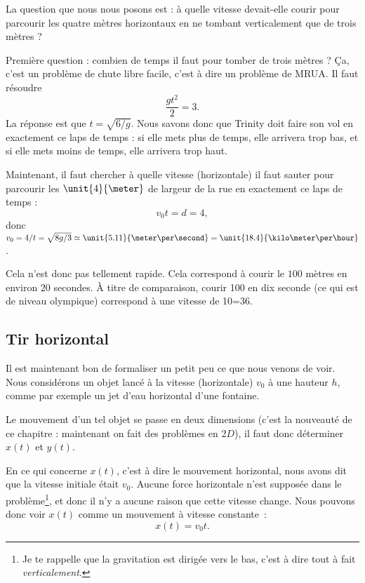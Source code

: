\documentclass[a4paper,12pt]{book}
\theoremstyle{mes_exemples}	\newtheorem{exemple}[numtho]{Exemple}
\theoremstyle{mes_tho}
\begin{document}
La question que nous nous posons est : à quelle vitesse devait-elle courir pour parcourir les quatre mètres horizontaux en ne tombant verticalement que de trois mètres ?

Première question : combien de temps il faut pour tomber de trois mètres ? Ça, c'est un problème de chute libre facile, c'est à dire un problème de MRUA. Il faut résoudre
\begin{equation}
	\frac{ gt^2 }{ 2 }=3.
\end{equation}
La réponse est que $t=\sqrt{6/g}$. Nous savons donc que Trinity doit faire son vol en exactement ce laps de temps : si elle mets plus de temps, elle arrivera trop bas, et si elle mets moins de temps, elle arrivera trop haut.

Maintenant, il faut chercher à quelle vitesse (horizontale) il faut sauter pour parcourir les $\unit{4}{\meter}$ de largeur de la rue en exactement ce laps de temps :
\begin{equation}
	v_0t=d=4,
\end{equation}
donc $v_0=4/t=\sqrt{8g/3}\simeq \unit{5.11}{\meter\per\second}=\unit{18.4}{\kilo\meter\per\hour}$.

Cela n'est donc pas tellement rapide. Cela correspond à courir le $100$ mètres en environ $20$ secondes. À titre de comparaison, courir \unit{100}{\meter} en dix seconde (ce qui est de niveau olympique) correspond à une vitesse de \unit{10}{\meter\per\second}=\unit{36}{\kilo\meter\per\hour}.

\subsection{Tir horizontal}

Il est maintenant bon de formaliser un petit peu ce que nous venons de voir. Nous considérons un objet lancé à la vitesse (horizontale) $v_0$ à une hauteur $h$, comme par exemple un jet d'eau horizontal d'une fontaine.

Le mouvement d'un tel objet se passe en deux dimensions (c'est la nouveauté de ce chapitre : maintenant on fait des problèmes en $2D$), il faut donc déterminer $x(t)$ et $y(t)$.

En ce qui concerne $x(t)$, c'est à dire le mouvement horizontal, nous avons dit que la vitesse initiale était $v_0$. Aucune force horizontale n'est supposée dans le problème\footnote{Je te rappelle que la gravitation est dirigée vers le bas, c'est à dire tout à fait \emph{verticalement}.}, et donc il n'y a aucune raison que cette vitesse change. Nous pouvons donc voir $x(t)$ comme un mouvement à vitesse constante~:
\begin{equation}		\label{Eqxtvt}
	x(t)=v_0t.
\end{equation}
\end{document}

